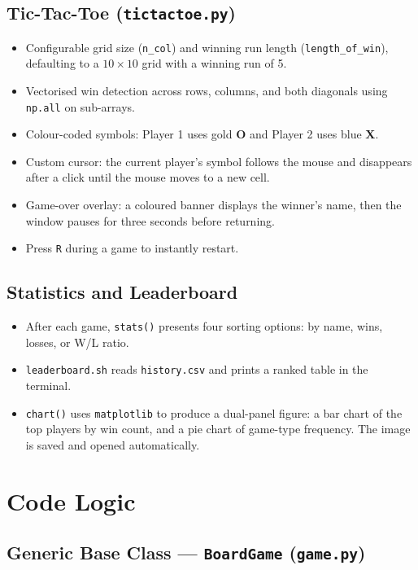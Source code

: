 \documentclass[12pt]{article}
\begin{document}
\subsection{Tic-Tac-Toe (\texttt{tictactoe.py})}
\begin{itemize}
    \item Configurable grid size (\texttt{n\_col}) and winning run length (\texttt{length\_of\_win}), defaulting to a $10 \times 10$ grid with a winning run of 5.
    \item Vectorised win detection across rows, columns, and both diagonals using \texttt{np.all} on sub-arrays.
    \item Colour-coded symbols: Player 1 uses gold \textbf{O} and Player 2 uses blue \textbf{X}.
    \item Custom cursor: the current player's symbol follows the mouse and disappears after a click until the mouse moves to a new cell.
    \item Game-over overlay: a coloured banner displays the winner's name, then the window pauses for three seconds before returning.
    \item Press \texttt{R} during a game to instantly restart.
\end{itemize}

\subsection{Statistics and Leaderboard}
\begin{itemize}
    \item After each game, \texttt{stats()} presents four sorting options: by name, wins, losses, or W/L ratio.
    \item \texttt{leaderboard.sh} reads \texttt{history.csv} and prints a ranked table in the terminal.
    \item \texttt{chart()} uses \texttt{matplotlib} to produce a dual-panel figure: a bar chart of the top players by win count, and a pie chart of game-type frequency. The image is saved and opened automatically.
\end{itemize}

\section{Code Logic}

\subsection{Generic Base Class --- \texttt{BoardGame} (\texttt{game.py})}
\end{document}
